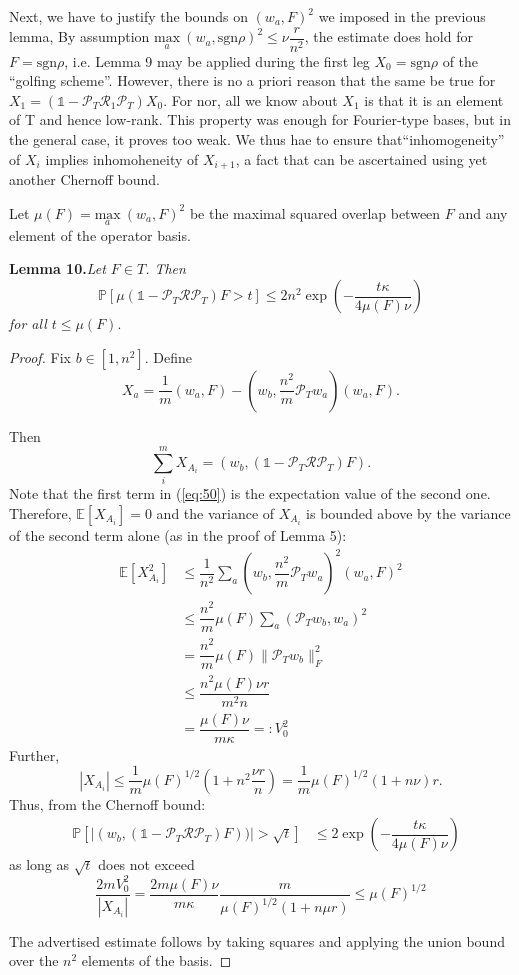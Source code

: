 \documentclass{article}
\begin{document}
Next, we have to justify the bounds on $(w_a,F)^2$ we imposed in the previous lemma, By assumption $\underset{a} {\mathrm{max}} ~(w_a,\text{sgn}\rho)^2 \le \nu\dfrac{r}{n^2}$, the estimate does hold for $F = \text{sgn} \rho$, i.e. Lemma 9 may be applied during the first leg $X_0 = \text{sgn} \rho$ of the ``golfing scheme''. However, there is no a priori reason that the same be true for $X_1 = (\mathbb{1}-\mathcal{P}_T\mathcal{R}_1\mathcal{P}_T)X_0$. For nor, all we know about $X_1$ is that it is an element of T and hence low-rank. This property was enough for Fourier-type bases, but in the general case, it proves too weak. We thus hae to ensure that``inhomogeneity'' of $X_i$ implies inhomoheneity of $X_{i+1}$, a fact that can be ascertained using yet another Chernoff bound.

Let $\mu(F) = \underset{a} {\mathrm{max}} ~(w_a,F)^2$ be the maximal squared overlap between $F$ and any element of the operator basis.

\textbf{Lemma 10.}\textit{Let $F \in T$. Then}
\[
\mathbb{P}[ \mu(\mathbb{1}-\mathcal{P}_T\mathcal{R}\mathcal{P}_T)F > t] \le 2n^2 \exp \left( -\dfrac{t\kappa}{4\mu(F)\nu}\right)
\]
\textit{for all $t \le \mu(F)$}.
\begin{proof}
Fix $b \in [1,n^2]$. Define
\begin{equation}
X_a = \dfrac{1}{m}(w_a,F)-(w_b,\dfrac{n^2}{m}\mathcal{P}_Tw_a)(w_a,F).
\label{eq:50}
\end{equation}  

Then
\[
\sum_i^m X_{A_i} = (w_b,(\mathbb{1}-\mathcal{P}_T\mathcal{R}\mathcal{P}_T)F).
\]
Note that the first term in (\ref{eq:50}) is the expectation value of the second one. Therefore, $\mathbb{E}[X_{A_i}]=0$ and the variance of $X_{A_i}$ is bounded above by the variance of the second term alone (as in the proof of Lemma 5):
\begin{align*}
\mathbb{E}[X_{A_i}^2] & \le \dfrac{1}{n^2}\sum_a(w_b,\dfrac{n^2}{m}\mathcal{P}_Tw_a)^2(w_a,F)^2\\
& \le \dfrac{n^2}{m}\mu(F)\sum_a(\mathcal{P}_Tw_b,w_a)^2\\
& =  \dfrac{n^2}{m}\mu(F)\|\mathcal{P}_Tw_b\|_F^2\\
& \le \dfrac{n^2\mu(F)\nu r}{m^2n}\\
& = \dfrac{\mu(F)\nu}{m\kappa} =: V_0^2
\end{align*}
Further,
\[
|X_{A_i}| \le \dfrac{1}{m}\mu(F)^{1/2}\left(1+n^2\dfrac{\nu r}{n}\right) = \dfrac{1}{m}\mu(F)^{1/2}(1+n\nu)r.
\]
Thus, from the Chernoff bound:
\begin{align*}
& \mathbb{P}\left[|(w_b,(\mathbb{1}-\mathcal{P}_T\mathcal{R}\mathcal{P}_T)F))|> \sqrt{t} \right] 
&\le 2\exp\left(-\dfrac{t\kappa}{4\mu(F)\nu}\right)
\end{align*}
as long as $\sqrt{t}$ does not exceed
\[
\dfrac{2mV_0^2}{|X_{A_i}|} = \dfrac{2m\mu(F)\nu}{m\kappa}\dfrac{m}{\mu(F)^{1/2}(1+n\mu r)}\le \mu(F)^{1/2}
\]

The advertised estimate follows by taking squares and applying the union bound over the $n^2$ elements of the basis.
\end{proof}
\end{document}
